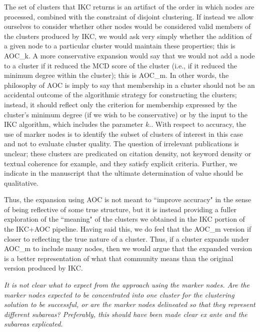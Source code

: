 \documentclass[11pt, oneside]{article}   	%
\begin{document}
{The set of clusters that IKC returns is an artifact of the order in which nodes are processed, combined with the constraint of disjoint clustering. If instead we allow ourselves to consider whether other nodes would be considered valid members of the clusters produced by IKC, we would ask very simply whether the addition of a given node to a particular cluster would maintain these properties; this is AOC\_k.  A more conservative expansion would say that we would not add a node to a cluster if it reduced the MCD score of the cluster (i.e., if it reduced the minimum degree within the cluster); this is AOC\_{m}.  In other words, the philosophy of AOC is imply to say that membership in a cluster should not be an accidental outcome of the algorithmic strategy for constructing the clusters; instead, it should reflect only the criterion for membership expressed by the cluster's minimum degree (if we wish to be conservative) or by the input to the IKC algorithm, which includes the parameter $k$.}. With respect to accuracy, the  use of marker nodes is to identify the subset of clusters of interest in this case and not to evaluate cluster quality. The question of irrelevant publications is unclear; these clusters are predicated on citation density, not keyword density or textual coherence for example, and they satisfy explicit criteria. Further, we indicate in the manuscript that the ultimate determination of value should be qualitative.

Thus, the expansion using AOC is not meant to ``improve accuracy" in the sense of being reflective of some true structure, but it is instead providing a fuller exploration of the ``meaning" of the clusters we obtained in the IKC portion of the IKC+AOC pipeline.  Having said this, we do feel that the AOC\_{m} version if closer to reflecting the true nature of a cluster. Thus, if a cluster expands under AOC\_{m}  to include many nodes, then we would argue that the expanded version  is a better representation of what that community means than the original version produced by IKC. 

\vspace{2 mm}  
\emph{It is not clear what to expect from the approach using the marker nodes. Are the marker nodes expected to be concentrated into one cluster for the clustering solution to be successful, or are the marker nodes delineated so that they represent different subareas? Preferably, this should have been made clear ex ante and the subareas explicated.}
\end{document}
